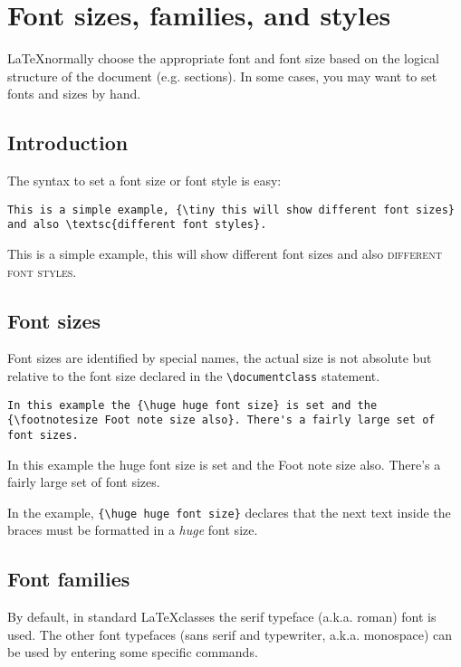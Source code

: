 
\chapter{Font sizes, families, and styles}

\LaTeX normally choose the appropriate font and font size based on the logical structure of the document (e.g. sections). In some cases, you may want to set fonts and sizes by hand.

\section{Introduction}
The syntax to set a font size or font style is easy:

\begin{lstlisting}[language={[LaTeX]TeX}]
This is a simple example, {\tiny this will show different font sizes} and also \textsc{different font styles}.
\end{lstlisting}

This is a simple example, {\tiny this will show different font sizes} and also \textsc{different font styles}.

\section{Font sizes}
Font sizes are identified by special names, the actual size is not absolute but relative to the font size declared in the \lstinline[language={[LaTeX]TeX}]|\documentclass| statement.

\begin{lstlisting}[language={[LaTeX]TeX}]
In this example the {\huge huge font size} is set and the {\footnotesize Foot note size also}. There's a fairly large set of font sizes.
\end{lstlisting}

In this example the {\huge huge font size} is set and the {\footnotesize Foot note size also}. There's a fairly large set of font sizes.

In the example, \lstinline[language = {[LaTeX]TeX}]|{\huge huge font size}| declares that the next text inside the braces must be formatted in a \textit{huge} font size.

\section{Font families}
By default, in standard \LaTeX classes the serif typeface (a.k.a. roman) font is used. The other font typefaces (sans serif and typewriter, a.k.a. monospace) can be used by entering some specific commands.

